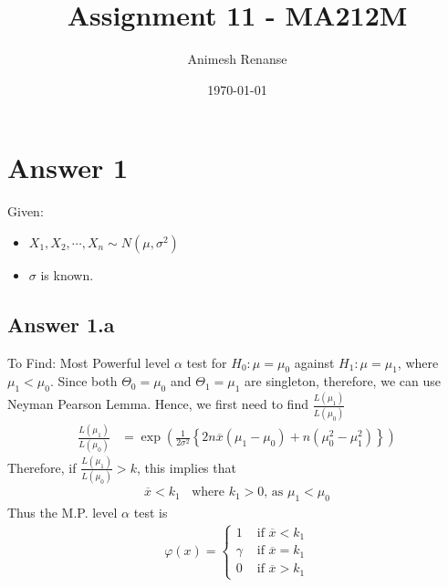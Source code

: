\documentclass[a4paper]{article}
\title{Assignment 11 - MA212M}
\author{Animesh Renanse}
\date{\today}
\begin{document}
\maketitle
\newpage
\section{Answer 1}
Given:
\begin{itemize}
	\item {$X_1,X_2, \cdots, X_n \sim N\left( \mu,\sigma^2 \right) $ 
		}
	\item{$\sigma$ is known.}
\end{itemize}
\subsection{Answer 1.a}
To Find: Most Powerful level $\alpha$ test for $H_0 : \mu = \mu_0$ against $H_1 : \mu = \mu_1$, where $\mu_1<\mu_0$.
\newline\newline
Since both $\Theta_0 = \mu_0$ and $\Theta_1 = \mu_1$ are singleton, therefore, we can use Neyman Pearson Lemma.
\newline\newline
Hence, we first need to find $\frac{L\left( \mu_1 \right) }{L\left( \mu_0 \right) }$
\begin{equation*}
	\begin{split}
		\frac{L\left( \mu_1 \right) }{L\left( \mu_0 \right) } &= \exp\left( \frac{1}{2\sigma^2} \left\{ 2n\overline{x}\left( \mu_1-\mu_0 \right) + n\left( \mu_0^2 - \mu_1^2 \right)  \right\}  \right) 
	\end{split}
\end{equation*}
Therefore, if $\frac{L\left( \mu_1 \right) }{L\left( \mu_0 \right) } > k$, this implies that
\begin{equation*}
	\begin{split}
		\overline{x} < k_1 \;\;\text{ where $k_1 > 0$, as $\mu_1 < \mu_0 $}
	\end{split}
\end{equation*}
Thus the M.P. level $\alpha$ test is
\begin{equation*}
	\begin{split}
		\varphi\left( x \right) = \begin{cases}
			1 & \text{ if } \overline{x} < k_1\\
			\gamma & \text{ if } \overline{x} = k_1\\
			0 & \text{ if } \overline{x} > k_1
		\end{cases}
	\end{split}
\end{equation*}
\end{document}
